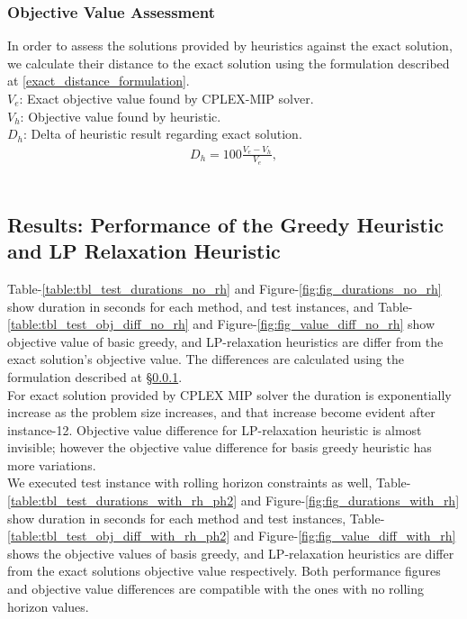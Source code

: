 \documentclass[11pt]{article}
\begin{document}
\subsubsection{Objective Value Assessment} \label{s:objective_value_assesment}
In order to assess the solutions provided by heuristics against the exact solution, we calculate their distance to the exact solution using the formulation described at \equationautorefname \eqref{exact_distance_formulation}.\\

\noindent $V_{e}$: Exact objective value found by CPLEX-MIP solver. \\
\noindent $V_{h}$: Objective value found by heuristic. \\
\noindent $D_{h}$: Delta of heuristic result regarding exact solution. \\
\begin{align}
&D_{h} = 100 \frac{V_{e} - V_{h}}{V_{e}}, \label{exact_distance_formulation}&
\end{align}\\

\subsection{Results: Performance of the Greedy Heuristic and LP Relaxation Heuristic} \label{s:test_evaluation}
Table-\ref{table:tbl_test_durations_no_rh} and Figure-\ref{fig:fig_durations_no_rh} show duration in seconds for each method, and test instances, and Table-\ref{table:tbl_test_obj_diff_no_rh} and Figure-\ref{fig:fig_value_diff_no_rh} show  objective value of basic greedy, and LP-relaxation heuristics are differ from the exact solution's objective value. The differences are calculated using the formulation described at \S \ref{s:objective_value_assesment}.\\

For exact solution provided by CPLEX MIP solver the duration is exponentially increase as the problem size increases, and that increase become evident after instance-12. Objective value difference for LP-relaxation heuristic is almost invisible; however the objective value difference for basis greedy heuristic has more variations.\\

We executed test instance with rolling horizon constraints as well, Table-\ref{table:tbl_test_durations_with_rh_ph2} and Figure-\ref{fig:fig_durations_with_rh} show duration in seconds for each method and test instances, Table-\ref{table:tbl_test_obj_diff_with_rh_ph2} and Figure-\ref{fig:fig_value_diff_with_rh} shows the objective values of basis greedy, and LP-relaxation heuristics are differ from the exact solutions objective value respectively. Both performance figures and objective value differences are compatible with the ones with no rolling horizon values.\\
\end{document}
